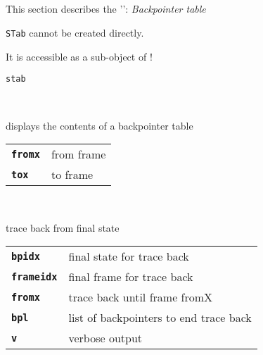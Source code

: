
\subsection{}

This section describes the '': \textsl{Backpointer table}

\begin{description}
\vspace{3mm}  \item[Creation:] \texttt{STab} cannot be created directly.\

It is accessible as a sub-object of !

\vspace{3mm} \item[Methods:] \texttt{stab}

    \begin{description}
       \texttt{  } \

        displays the contents of a backpointer table

      \begin{tabular}{ll}
 \texttt{\textbf{fromx}} &  from frame  \\
 \texttt{\textbf{tox}} &    to frame  \\
      \end{tabular}
       \texttt{     } \

        trace back from final state

      \begin{tabular}{ll}
 \texttt{\textbf{bpidx}} &     final state for trace back  \\
 \texttt{\textbf{frameidx}} &  final frame for trace back  \\
 \texttt{\textbf{fromx}} &     trace back until frame fromX  \\
 \texttt{\textbf{bpl}} &       list of backpointers to end trace back  \\
 \texttt{\textbf{v}} &         verbose output  \\
      \end{tabular}
    \end{description}

\end{description}

